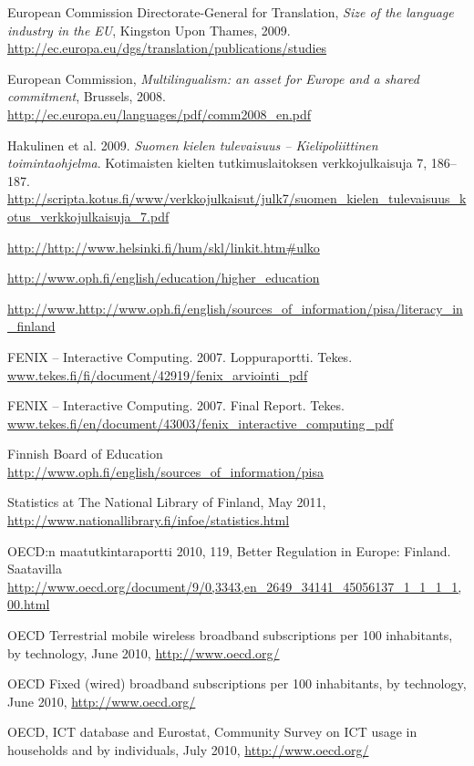 \documentclass[]{../../metanetpaper}
\begin{document}
\begin{Parallel}[c]{70mm}{70mm}
\begin{thebibliography}{102}
European Commission Directorate-General for Translation,
\emph{Size of the language industry in the EU}, Kingston Upon Thames, 2009.
\url{http://ec.europa.eu/dgs/translation/publications/studies}

European Commission,
\emph{Multilingualism: an asset for Europe and a shared commitment},
Brussels, 2008.
\url{http://ec.europa.eu/languages/pdf/comm2008_en.pdf}

Hakulinen et al. 2009.
\emph{Suomen kielen tulevaisuus -- Kielipoliittinen
toimintaohjelma}. Kotimaisten kielten tutkimuslaitoksen verkkojulkaisuja 7,
186–187.
\url{http://scripta.kotus.fi/www/verkkojulkaisut/julk7/suomen_kielen_tulevaisuus_kotus_verkkojulkaisuja_7.pdf}

\url{http://http://www.helsinki.fi/hum/skl/linkit.htm#ulko}

\url{http://www.oph.fi/english/education/higher_education}

\url{http://www.http://www.oph.fi/english/sources_of_information/pisa/literacy_in_finland}

FENIX -- Interactive Computing. 2007. Loppuraportti. Tekes.
\url{www.tekes.fi/fi/document/42919/fenix_arviointi_pdf}

FENIX -- Interactive Computing. 2007. Final Report. Tekes.
\url{www.tekes.fi/en/document/43003/fenix_interactive_computing_pdf}

Finnish Board of Education
\url{http://www.oph.fi/english/sources_of_information/pisa}

Statistics at The National Library of Finland, May 2011,
\url{http://www.nationallibrary.fi/infoe/statistics.html}

OECD:n maatutkintaraportti 2010, 119, Better Regulation in Europe:
Finland. Saatavilla
\url{http://www.oecd.org/document/9/0,3343,en_2649_34141_45056137_1_1_1_1,00.html}

OECD Terrestrial mobile wireless broadband subscriptions per 100 inhabitants,
by technology, June 2010, \url{http://www.oecd.org/}

OECD Fixed (wired) broadband subscriptions per 100 inhabitants, by
technology, June 2010, \url{http://www.oecd.org/}

OECD, ICT database and Eurostat, Community Survey on ICT usage in households
and by individuals, July 2010, \url{http://www.oecd.org/}


\end{thebibliography}
\end{Parallel}
\end{document}
